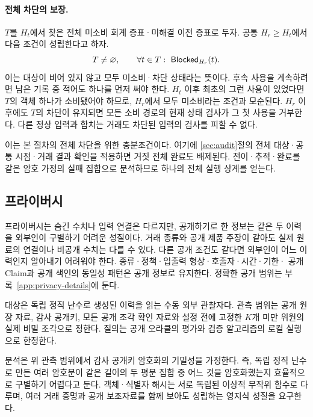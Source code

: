 \paragraph{전체 차단의 보장.}

$T$를 $H_t$에서 찾은 전체 미소비 회계 증표·미해결 이전 증표로 두자.
공통 $H_r\geq H_t$에서 다음 조건이 성립한다고 하자.
\begin{equation}
 T\ne\varnothing,\qquad
 \forall t\in T:\ \mathsf{Blocked}_{H_r}(t).
 \label{eq:frontier-cut}
\end{equation}
이는 대상이 비어 있지 않고 모두 미소비·차단 상태라는 뜻이다.
후속 사용을 계속하려면 남은 기록 중 적어도 하나를 먼저 써야 한다.
$H_t$ 이후 최초의 그런 사용이 있었다면 $T$의 객체 하나가 소비됐어야
하므로, $H_r$에서 모두 미소비라는 조건과 모순된다.
$H_r$ 이후에도 $T$의 차단이 유지되면 모든 소비 경로의 현재 상태
검사가 그 첫 사용을 거부한다. 다른 정상 입력과 합치는 거래도
차단된 입력의 검사를 피할 수 없다.

이는 본 절차의 전체 차단을 위한 충분조건이다.
여기에 \ref{sec:audit}절의 전체 대상·공통 시점·거래 결과 확인을 적용하면
거짓 전체 완료도 배제된다. 전이·추적·완료를 같은 암호 가정의
실패 집합으로 분석하므로 하나의 전체 실행 상계를 얻는다.

\subsection{프라이버시}
\label{sec:privacy-proof}

프라이버시는 숨긴 수치나 입력 연결은 다르지만,
공개하기로 한 정보는 같은 두 이력을 외부인이 구별하기 어려운 성질이다.
거래 종류와 공개 제품 주장이 같아도 실제 원료의 연결이나 비공개
수치는 다를 수 있다. 다른 공개 조건도 같다면 외부인이 어느 이력인지
알아내기 어려워야 한다. 종류·정책·입출력 형상·호출자·시간·기한·
공개 Claim과 공개 색인의 동일성 패턴은 공개 정보로 유지한다.
정확한 공개 범위는 부록~\ref{app:privacy-details}에 둔다.

대상은 독립 정직 난수로 생성된 이력을 읽는 수동 외부 관찰자다.
관측 범위는 공개 원장 자료, 감사 공개키, 모든 공개 조각 확인 자료와
설정 전에 고정한 $K$개 미만 위원의 실제 비밀 조각으로 정한다.
질의는 공개 오라클의 평가와 검증 알고리즘의 로컬 실행으로 한정한다.

분석은 위 관측 범위에서 감사 공개키 암호화의 기밀성을 가정한다.
즉, 독립 정직 난수로 만든 여러 암호문이 같은 길이의 두 평문 집합 중
어느 것을 암호화했는지 효율적으로 구별하기 어렵다고 둔다.
객체·식별자 해시는 서로 독립된 이상적 무작위 함수로 다루며,
여러 거래 증명과 공개 보조자료를 함께 보아도 성립하는 영지식 성질을 요구한다.

